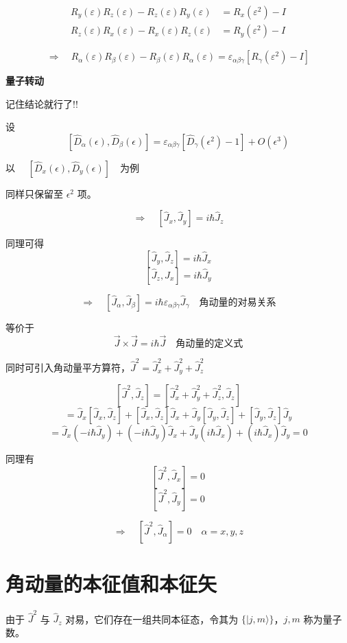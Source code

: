 \documentclass[lang=cn,10pt]{elegantbook}
\begin{document}
\begin{align*}
	R_y(\varepsilon) R_z(\varepsilon) - R_z(\varepsilon) R_y(\varepsilon) &= R_x(\varepsilon^2) - I \\
	R_z(\varepsilon) R_x(\varepsilon) - R_x(\varepsilon) R_z(\varepsilon) &= R_y(\varepsilon^2) - I
\end{align*}

\[
\Longrightarrow \quad R_\alpha(\varepsilon) R_\beta(\varepsilon) - R_\beta(\varepsilon) R_\alpha(\varepsilon) = \varepsilon_{\alpha\beta\gamma} \left[ R_\gamma(\varepsilon^2) - I \right]
\]


\textbf{量子转动}

记住结论就行了!!

设
\[
\left[ \hat{D}_\alpha(\epsilon), \hat{D}_\beta(\epsilon) \right] = \varepsilon_{\alpha\beta\gamma}\left[\hat{D}_\gamma(\epsilon^2)-1\right]+O(\epsilon^3)
\]

以 $\quad \left[ \hat{D}_x(\epsilon), \hat{D}_y(\epsilon) \right] \quad \text{为例}$

同样只保留至 \(\epsilon^2\) 项。


\[
\Rightarrow \quad [\hat{J}_x, \hat{J}_y] = i \hbar \hat{J}_z
\]


同理可得
\[
[\hat{J}_y, \hat{J}_z] = i\hbar \hat{J}_x
\]
\[
[\hat{J}_z, \hat{J}_x] = i\hbar \hat{J}_y
\]

\[
\Rightarrow \quad [\hat{J}_\alpha, \hat{J}_\beta] = i\hbar \varepsilon_{\alpha\beta\gamma} \hat{J}_\gamma \quad \text{角动量的对易关系}
\]

等价于
\[
\vec{J} \times \vec{J} = i\hbar \vec{J} \quad \text{角动量的定义式}
\]

同时可引入角动量平方算符，\(\hat{J}^2 = \hat{J}_x^2 + \hat{J}_y^2 + \hat{J}_z^2\)

\[
[\hat{J}^2, \hat{J}_z] = [\hat{J}_x^2 + \hat{J}_y^2 + \hat{J}_z^2, \hat{J}_z]
\]
\[
= \hat{J}_x [\hat{J}_x, \hat{J}_z] + [\hat{J}_x, \hat{J}_z] \hat{J}_x + \hat{J}_y [\hat{J}_y, \hat{J}_z] + [\hat{J}_y, \hat{J}_z] \hat{J}_y
\]
\[
= \hat{J}_x (-i\hbar \hat{J}_y) + (-i\hbar \hat{J}_y) \hat{J}_x + \hat{J}_y (i\hbar \hat{J}_x) + (i\hbar \hat{J}_x) \hat{J}_y = 0
\]

同理有
\[
[\hat{J}^2, \hat{J}_x] = 0
\]
\[
[\hat{J}^2, \hat{J}_y] = 0
\]

\[
\Rightarrow \quad [\hat{J}^2, \hat{J}_\alpha] = 0 \quad \alpha = x, y, z
\]

\section{角动量的本征值和本征矢}
由于 \(\hat{J}^2\) 与 \(\hat{J}_z\) 对易，它们存在一组共同本征态，令其为 \(\{|j, m\rangle\}\)，\(j, m\) 称为量子数。
\end{document}
